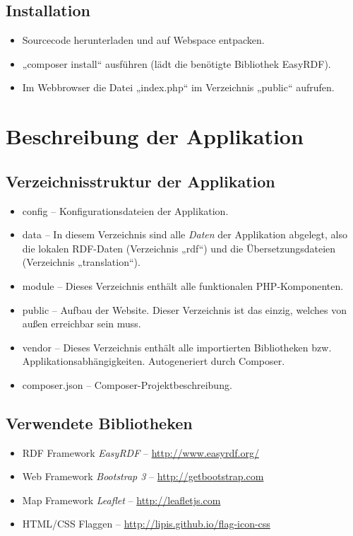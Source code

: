 \documentclass[11pt,a4paper]{article}
\begin{document}
\subsection{Installation}
\begin{itemize}\itemsep0pt
\item Sourcecode herunterladen und auf Webspace entpacken.
\item „composer install“ ausführen (lädt die benötigte Bibliothek EasyRDF).
\item Im Webbrowser die Datei „index.php“ im Verzeichnis „public“ aufrufen.
\end{itemize}

\section{Beschreibung der Applikation}
\subsection{Verzeichnisstruktur der Applikation}
\begin{itemize}
\item config -- Konfigurationsdateien der Applikation.
\item data -- In diesem Verzeichnis sind alle \emph{Daten} der Applikation
  abgelegt, also die lokalen RDF-Daten (Verzeichnis „rdf“) und die
  Übersetzungsdateien (Verzeichnis „translation“).
\item module -- Dieses Verzeichnis enthält alle funktionalen PHP-Komponenten.
\item public -- Aufbau der Website. Dieser Verzeichnis ist das einzig, welches
  von außen erreichbar sein muss.
\item vendor -- Dieses Verzeichnis enthält alle importierten Bibliotheken
  bzw. Applikationsabhängigkeiten. Autogeneriert durch Composer.
\item composer.json -- Composer-Projektbeschreibung.
\end{itemize}
\subsection{Verwendete Bibliotheken}
\begin{itemize}\itemsep0pt
\item RDF Framework \emph{EasyRDF} -- \url{http://www.easyrdf.org/}
\item Web Framework \emph{Bootstrap 3} -- \url{http://getbootstrap.com}
\item Map Framework \emph{Leaflet} -- \url{http://leafletjs.com}
\item HTML/CSS Flaggen -- \url{http://lipis.github.io/flag-icon-css}
\end{itemize}
\end{document}
